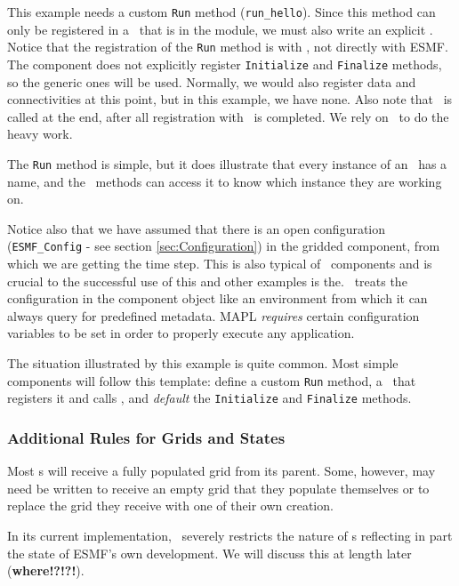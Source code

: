 \normalsize


This example needs a custom \texttt{Run} method (\texttt{run\_hello}).
Since this method can only be registered in a \ssv\
that is in the module, we must also write an explicit \ssv.
Notice that the registration of the \texttt{Run} method is with \ggn ,
not directly with ESMF. 
The component does not explicitly register \texttt{Initialize} and
\texttt{Finalize} methods, so the generic ones will be used. Normally,
we would also register data and
connectivities at this point, but in this example, we have none.
Also note that \gssv\  is called at the end, after all registration
with \ggn\ is completed. We rely on \gssv\ to do the heavy work. 

The \texttt{Run} method is simple, but it does illustrate that every
instance of an \egc\  has a name, and the \IRF\ methods can access it to
know which instance they are working on.


Notice also that we have assumed that there is an 
open configuration (\texttt{ESMF\_Config} - see section \ref{sec:Configuration})
in the gridded component, from which we are 
getting the time step. This is also typical of \ggn\ components and is
crucial to the successful use of this and other examples is the.
\ggn\ treats the configuration in the component object like an
environment from which it can always query for predefined
metadata. MAPL \emph{requires} certain configuration variables to be set
in order to properly execute any application.

The situation illustrated by this example is quite common. Most simple
components will follow this template: define a custom \texttt{Run} method,
a \ssv\  that registers it and calls \gssv, and
\emph{default} the \texttt{Initialize} and \texttt{Finalize} methods.



\subsubsection{Additional Rules for Grids and States}
\label{sec:addRules}
Most \ggc s will receive a fully populated grid from
its parent. Some, however, may need be written to receive an empty
grid that they populate themselves or to replace the grid they receive
with one of their own creation.

In its current implementation, \ggn\ severely restricts the nature
of \grd s reflecting in part the state of ESMF's own development.
We will discuss this at length later (\textbf{where!?!?!}).

